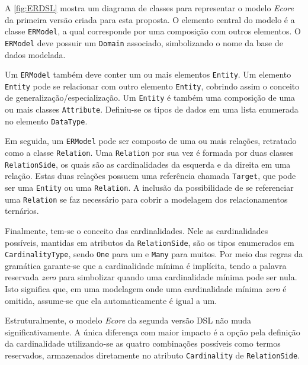 A \autoref{fig:ERDSL} mostra um diagrama de classes para representar o modelo \textit{Ecore} da primeira versão criada para esta proposta. 
O elemento central do modelo é a classe \texttt{ERModel}, a qual corresponde por uma composição com outros elementos. 
O \texttt{ERModel} deve possuir um \texttt{Domain} associado, simbolizando o nome da base de dados modelada. 

Um \texttt{ERModel} também deve conter um ou mais elementos \texttt{Entity}. 
Um elemento \texttt{Entity} pode se relacionar com outro elemento \texttt{Entity}, cobrindo assim o conceito de generalização/especialização. 
Um \texttt{Entity} é também uma composição de uma ou mais classes \texttt{Attribute}. 
Definiu-se os tipos de dados em uma lista enumerada no elemento \texttt{DataType}.

Em seguida, um \texttt{ERModel} pode ser composto de uma ou mais relações, retratado como a classe \texttt{Relation}. 
Uma \texttt{Relation} por sua vez é formada por duas classes \texttt{RelationSide}, os quais são as cardinalidades da esquerda e da direita em uma relação. 
Estas duas relações possuem uma referência chamada \texttt{Target}, que pode ser uma \texttt{Entity} ou uma \texttt{Relation}. 
A inclusão da possibilidade de se referenciar uma \texttt{Relation} se faz necessário para cobrir a modelagem dos relacionamentos ternários.

Finalmente, tem-se o conceito das cardinalidades. 
Nele as cardinalidades possíveis, mantidas em atributos da \texttt{RelationSide}, são os tipos enumerados em \texttt{CardinalityType}, sendo \texttt{One} para um e \texttt{Many} para muitos. 
Por meio das regras da gramática garante-se que a cardinalidade mínima é implícita, tendo a palavra reservada \textit{zero} para simbolizar quando uma cardinalidade mínima pode ser nula. 
Isto significa que, em uma modelagem onde uma cardinalidade mínima \textit{zero} é omitida, assume-se que ela automaticamente é igual a um.


Estruturalmente, o modelo \textit{Ecore} da segunda versão \ac{DSL} não muda significativamente. 
A única diferença com maior impacto é a opção pela definição da cardinalidade utilizando-se as quatro combinações possíveis como termos reservados, armazenados diretamente no atributo \texttt{Cardinality} de \texttt{RelationSide}.

